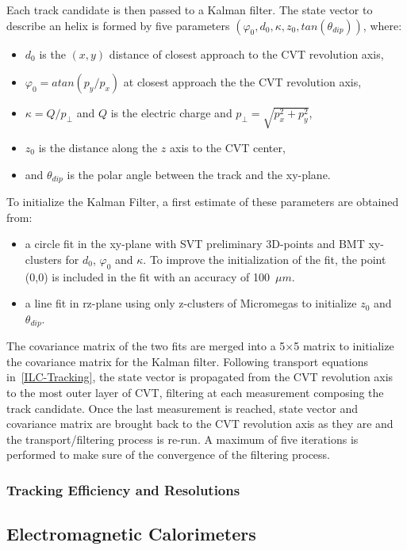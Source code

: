 \documentclass{elsart}
\begin{document}
Each track candidate is then passed to a Kalman filter. The state vector to describe an helix is formed by five 
parameters $(\varphi_0, d_0, \kappa, z_0, tan(\theta_{dip}))$, where:
\begin{itemize}
\item $d_0$ is the $(x,y)$ distance of closest approach to the CVT revolution axis,
  \item $\varphi_0 = atan(p_y/p_x)$ at closest approach the the CVT revolution axis, 
  \item $\kappa=Q/p_\perp$ and $Q$ is the electric charge and $p_\perp=\sqrt{p_x^2+p_y^2}$,
  \item $z_0$ is the distance along the $z$ axis to the CVT center,
  \item and $\theta_{dip}$ is the polar angle between the track and the xy-plane.
\end{itemize}

To initialize the Kalman Filter, a first estimate of these parameters are obtained from:
\begin{itemize}
\item a circle fit in the xy-plane with SVT preliminary 3D-points and BMT xy-clusters for $d_0$, $\varphi_0$ and 
$\kappa$. To improve the initialization of the fit, the point (0,0) is included in the fit with an accuracy of 100~$\mu 
m$.
\item a line fit in rz-plane using only z-clusters of Micromegas to initialize $z_0$ and $\theta_{dip}$.
\end{itemize}
The covariance matrix of the two fits are merged into a 5$\times$5 matrix to initialize the covariance matrix for the 
Kalman filter. Following transport equations in~\ref{ILC-Tracking}, the state vector is propagated from the CVT 
revolution axis to the most outer layer of CVT, filtering at each measurement composing the track candidate. Once the 
last measurement is reached, state vector and covariance matrix are brought back to the CVT revolution axis as they are 
and the transport/filtering process is re-run. A maximum of five iterations is performed to make sure of the 
convergence of the filtering process. 

\subsubsection{Tracking Efficiency and Resolutions}

\subsection{Electromagnetic Calorimeters}
\end{document}
